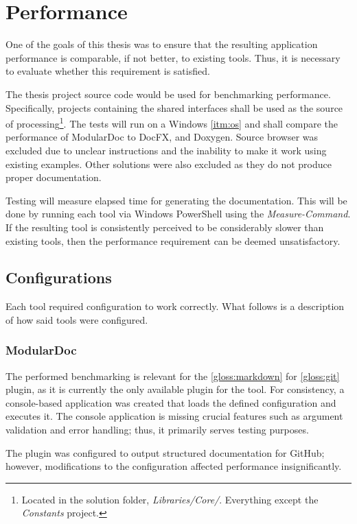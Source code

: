 \chapter{Performance}

One of the goals of this thesis was to ensure that the resulting application performance is comparable, if not better, to existing tools. Thus, it is necessary to evaluate whether this requirement is satisfied.

The thesis project source code would be used for benchmarking performance.
Specifically, projects containing the shared interfaces shall be used as the source of processing\footnote{Located in the solution folder, \textit{Libraries/Core/}. Everything except the \textit{Constants} project.}.
The tests will run on a Windows \ref{itm:os} and shall compare the performance of ModularDoc to DocFX, and Doxygen. Source browser was excluded due to unclear instructions and the inability to make it work using existing examples. Other solutions were also excluded as they do not produce proper documentation.

Testing will measure elapsed time for generating the documentation. This will be done by running each tool via Windows PowerShell using the \textit{Measure-Command}. If the resulting tool is consistently perceived to be considerably slower than existing tools, then the performance requirement can be deemed unsatisfactory.

\section{Configurations}

Each tool required configuration to work correctly. What follows is a description of how said tools were configured.

\subsection{ModularDoc}

The performed benchmarking is relevant for the \ref{gloss:markdown} for \ref{gloss:git} plugin, as it is currently the only available plugin for the tool. For consistency, a console-based application was created that loads the defined configuration and executes it. The console application
is missing crucial features such as argument validation and error handling; thus, it primarily serves testing purposes.

The plugin was configured to output structured documentation for GitHub; however, modifications to the configuration affected performance insignificantly.

